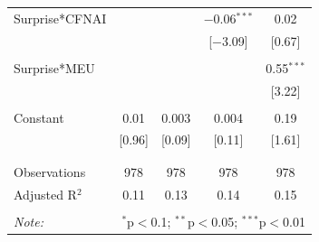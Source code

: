\documentclass[12pt]{article}
\begin{document}
\begin{table}[!htbp]
\begin{tabular}{@{\extracolsep{5pt}}lcccc}
 Surprise*CFNAI &  &  & $-$0.06$^{***}$ & 0.02 \\ 
  &  &  & [$-$3.09] & [0.67] \\ 
  & & & & \\ 
 Surprise*MEU &  &  &  & 0.55$^{***}$ \\ 
  &  &  &  & [3.22] \\ 
  & & & & \\ 
 Constant & 0.01 & 0.003 & 0.004 & 0.19 \\ 
  & [0.96] & [0.09] & [0.11] & [1.61] \\ 
  & & & & \\ 
\hline \\[-1.8ex] 
Observations & 978 & 978 & 978 & 978 \\ 
Adjusted R$^{2}$ & 0.11 & 0.13 & 0.14 & 0.15 \\ 
\hline 
\hline \\[-1.8ex] 
\textit{Note:}  & \multicolumn{4}{r}{$^{*}$p$<$0.1; $^{**}$p$<$0.05; $^{***}$p$<$0.01} \\ 
\end{tabular} 
\end{table}




\end{document}
